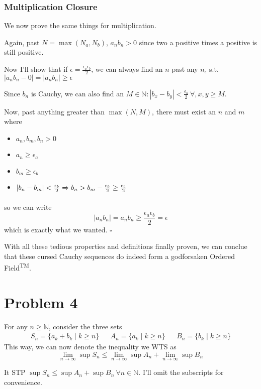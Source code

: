 \documentclass[12pt]{article}
\newcommand{\ra}{\xRightarrow}
\newcommand{\N}{\mathbb{N}}
\begin{document}
\subsubsection{Multiplication Closure}

We now prove the same things for multiplication.

Again, past $N = \max(N_a, N_b)$, $a_nb_n > 0$
since two a positive times a positive is still positive.

Now I'll show that if $\epsilon=\frac{\epsilon_a\epsilon_b}{2}$,
we can always find an $n$ past any $n_\epsilon$ s.t. $|a_nb_n-0|=|a_nb_n| \ge \epsilon$

Since $b_n$ is Cauchy, we can also find an $M \in \N: |b_x-b_y| < \frac{\epsilon_b}{2}\ \forall, x, y \ge M$.

Now, past anything greater than $\max(N, M)$, there must exist an $n$ and $m$ where
\begin{itemize}[nolistsep]
  \item $a_n, b_m, b_n > 0$
  \item $a_n \ge \epsilon_a$
  \item $b_m \ge \epsilon_b$
  \item $|b_n-b_m| < \frac{\epsilon_b}{2} \ra{} b_n > b_m - \frac{\epsilon_b}{2} \ge \frac{\epsilon_b}{2}$
\end{itemize}
so we can write
\[|a_nb_n|=a_nb_n \ge \frac{\epsilon_a\epsilon_b}{2}=\epsilon\]
which is exactly what we wanted. $\square$

With all these tedious properties and definitions finally proven,
we can conclue that these cursed Cauchy sequences do indeed form a godforsaken Ordered Field\textsuperscript{TM}.

\pagebreak

\section{Problem 4}\label{sec:p4}

For any $n \ge \N$, consider the three sets
\begin{align*}
  S_n=\{a_k+b_k \mid k \ge n\}
   &  & A_n=\{a_k \mid k \ge n\}
   &  & B_n=\{b_k \mid k \ge n\}
\end{align*}
This way, we can now denote the inequality we WTS as
\[\lim_{n \to \infty} \sup S_n \le \lim_{n \to \infty} \sup A_n + \lim_{n \to \infty} \sup B_n\]

It STP $\sup S_n \le \sup A_n + \sup B_n\ \forall n \in \N$.
I'll omit the subscripts for convenience.
\end{document}
